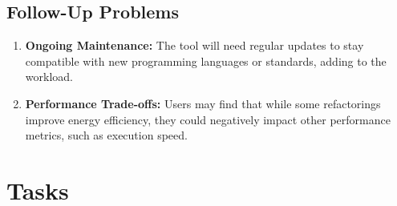 \documentclass[12pt]{article}
\begin{document}
\subsection{Follow-Up Problems}
\begin{enumerate}
  \item \textbf{Ongoing Maintenance:} The tool will need regular
    updates to stay compatible with new programming languages or
    standards, adding to the workload.
  \item \textbf{Performance Trade-offs:} Users may find that while
    some refactorings improve energy efficiency, they could
    negatively impact other performance metrics, such as execution speed.
\end{enumerate}
\section{Tasks}
\end{document}
